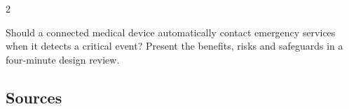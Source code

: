 \begin{multicols}{2}
\begin{speaking}
Should a connected medical device automatically contact emergency services when it detects a critical event? Present the benefits, risks and safeguards in a four-minute design review.
\end{speaking}
\end{multicols}

\subsection*{Sources}
